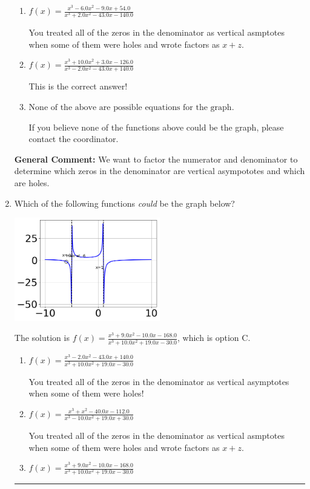 \documentclass{extbook}[14pt]
\newcommand{\litem}[1]{\item #1

\rule{\textwidth}{0.4pt}}
\begin{document}
\begin{enumerate}
{\begin{enumerate}[label=\Alph*.]
Remember that factors are written as $x-z$. For example, the zero $x=4$ corresponds to the factor $x-(4)$.
\item \( f(x)=\frac{x^{3} -6.0 x^{2} -9.0 x + 54.0}{x^{3} +2.0 x^{2} -43.0 x -140.0} \)

You treated all of the zeros in the denominator as vertical asmptotes when some of them were holes and wrote factors as $x+z$.
\item \( f(x)=\frac{x^{3} +10.0 x^{2} +3.0 x -126.0}{x^{3} -2.0 x^{2} -43.0 x + 140.0} \)

This is the correct answer!
\item \( \text{None of the above are possible equations for the graph.} \)

If you believe none of the functions above could be the graph, please contact the coordinator.
\end{enumerate}

\textbf{General Comment:} We want to factor the numerator and denominator to determine which zeros in the denominator are vertical asympototes and which are holes.
}
\litem{
Which of the following functions \textit{could} be the graph below?

\begin{center}
    \includegraphics[width=0.5\textwidth]{../Figures/identifyGraphOfRationalFunctionC.png}
\end{center}


The solution is \( f(x)=\frac{x^{3} +9.0 x^{2} -10.0 x -168.0}{x^{3} +10.0 x^{2} +19.0 x -30.0} \), which is option C.\begin{enumerate}[label=\Alph*.]
\item \( f(x)=\frac{x^{3} -2.0 x^{2} -43.0 x + 140.0}{x^{3} +10.0 x^{2} +19.0 x -30.0} \)

You treated all of the zeros in the denominator as vertical asymptotes when some of them were holes!
\item \( f(x)=\frac{x^{3} + x^{2} -40.0 x -112.0}{x^{3} -10.0 x^{2} +19.0 x + 30.0} \)

You treated all of the zeros in the denominator as vertical asmptotes when some of them were holes and wrote factors as $x+z$.
\item \( f(x)=\frac{x^{3} +9.0 x^{2} -10.0 x -168.0}{x^{3} +10.0 x^{2} +19.0 x -30.0} \)


\end{enumerate}}
\end{enumerate}
\end{document}
